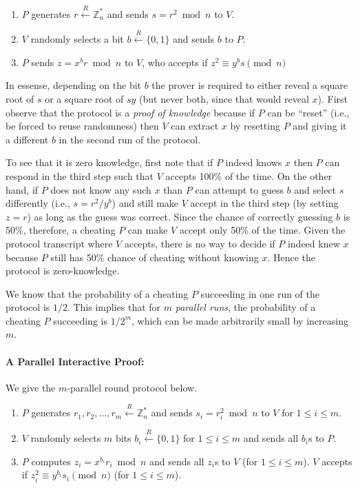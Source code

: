 \documentclass[]{report}   %
\newcommand{\rand}{\stackrel{R}{\leftarrow}}
\begin{document}
\begin{enumerate}
	\item $P$ generates $r\rand \mathbb{Z}^*_n$ and sends $s = r^2\bmod{n}$ to $V$.
	\item $V$ randomly selects a bit $b\rand \{0, 1\}$ and sends $b$ to $P$.
	\item $P$ sends $z=x^br \bmod{n}$ to $V$, who accepts if $z^2 \equiv y^bs\pmod{n}$
\end{enumerate}

In essense, depending on the bit $b$ the prover is required to either reveal a square root of $s$ or a square root of $sy$ (but never both, since that would reveal $x$). 
First observe that the protocol is a {\em proof of knowledge} because if $P$ can be ``reset'' (i.e., be forced to reuse randomness) then $V$ can extract $x$ by resetting $P$ and giving it a different $b$ in the second run of the protocol. 

To see that it is zero knowledge, first note that if $P$ indeed knows $x$ then $P$ can respond in the third step such that $V$ accepts 100\% of the time. On the other hand, if $P$ does not know any such $x$ than $P$ can attempt to guess $b$ and select $s$ differently (i.e., $s=r^2/y^b$) and still make $V$ accept in the third step (by setting $z=r$) as long as the guess was correct. 
Since the chance of correctly guessing $b$ is 50\%, therefore, a cheating $P$ can make $V$ accept only 50\% of the time. 
Given the protocol transcript where $V$ accepts, there is no way to decide if $P$ indeed knew $x$ because $P$ still has 50\% chance of cheating without knowing $x$. Hence the protocol is zero-knowledge.

We know that the probability of a cheating $P$ succeeding in one run of the protocol is $1/2$. This implies that for $m$ {\em parallel runs}, the probability of a cheating $P$ succeeding is $1/2^m$, which can be made arbitrarily small by increasing $m$. 

\paragraph{A Parallel Interactive Proof:} We give the $m$-parallel round protocol below.

\begin{enumerate}
	\item $P$ generates $r_1, r_2, \ldots, r_m\rand \mathbb{Z}^*_n$ and sends $s_i = r_i^2\bmod{n}$ to $V$ for $1\leq i\leq m$.
	\item $V$ randomly selects $m$ bits $b_i\rand \{0, 1\}$  for $1\leq i\leq m$ and sends all $b_i$s to $P$.
	\item $P$ computes $z_i=x^{b_i}r_i \bmod{n}$ and sends all $z_i$s to $V$ (for $1\leq i\leq m$). $V$ accepts if $z_i^2 \equiv y^{b_i}s_i\pmod{n}$  (for $1\leq i\leq m$).
\end{enumerate}
\end{document}
